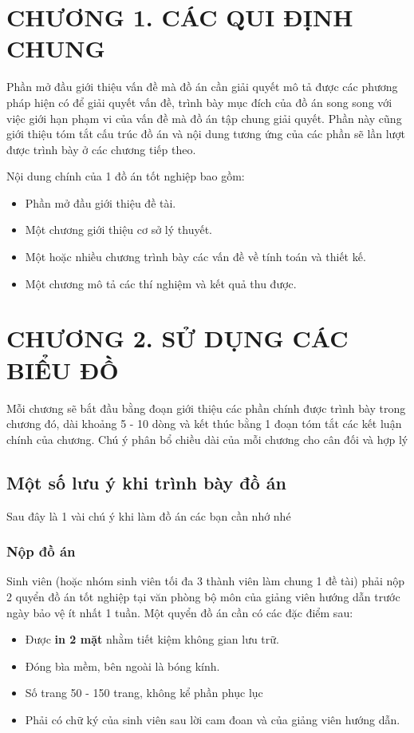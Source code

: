 \section*{\centering CHƯƠNG 1.	CÁC QUI ĐỊNH CHUNG}
\setcounter{section}{1}
\setcounter{subsection}{0}
\setcounter{figure}{0}
\setcounter{table}{0}
Phần mở đầu giới thiệu vấn đề mà đồ án cần giải quyết mô tả được các phương pháp hiện có để giải quyết vấn đề, trình bày mục đích của đồ án song song với việc giới hạn phạm vi của vấn đề mà đồ án tập chung giải quyết. Phần này cũng giới thiệu tóm tắt cấu trúc đồ án và nội dung tương ứng của các phần sẽ lần lượt được trình bày ở các chương tiếp theo.

Nội dung chính của 1 đồ án tốt nghiệp bao gồm:
\begin{itemize}
    \item Phần mở đầu giới thiệu đề tài.
    \item Một chương giới thiệu cơ sở lý thuyết.
    \item Một hoặc nhiều chương trình bày các vấn đề về tính toán và thiết kế.
    \item Một chương mô tả các thí nghiệm và kết quả thu được.
\end{itemize}


\cleardoublepage
\section*{\centering CHƯƠNG 2. SỬ DỤNG CÁC BIỂU ĐỒ}
\setcounter{section}{2}
\setcounter{subsection}{0}
\setcounter{figure}{0}
\setcounter{table}{0}
Mỗi chương sẽ bắt đầu bằng đoạn giới thiệu các phần chính được trình bày trong chương đó, dài khoảng 5 - 10 dòng và kết thúc bằng 1 đoạn tóm tắt các kết luận chính của chương. Chú ý phân bổ chiều dài của mỗi chương cho cân đối và hợp lý 
\subsection{Một số lưu ý khi trình bày đồ án}
Sau đây là 1 vài chú ý khi làm đồ án các bạn cần nhớ nhé
\subsubsection{Nộp đồ án}
Sinh viên (hoặc nhóm sinh viên tối đa 3 thành viên làm chung 1 đề tài) phải nộp 2 quyển đồ án tốt nghiệp tại văn phòng bộ môn của giảng viên hướng dẫn trước ngày bảo vệ ít nhất 1 tuần. Một quyển đồ án cần có các đặc điểm sau:
\begin{itemize}
    \item Được \textbf{in 2 mặt} nhằm tiết kiệm không gian lưu trữ.
    \item Đóng bìa mềm, bên ngoài là bóng kính. 
    \item Số trang 50 - 150 trang, không kể phần phục lục
    \item Phải có chữ ký của sinh viên sau lời cam đoan và của giảng viên hướng dẫn. 
\end{itemize}
